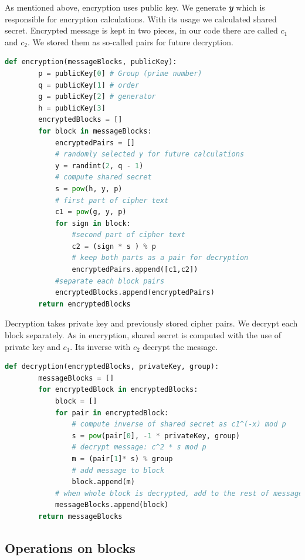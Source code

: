 \documentclass[a4paper,12pt]{article}
\begin{document}
As mentioned above, encryption uses public key. 
We generate \textbf{\textit{y}} which is responsible for encryption calculations. 
With its usage we calculated shared secret. 
Encrypted message is kept in two pieces, in our code there are called \textbf{\textit{$c_1$}} and \textbf{\textit{$c_2$}}.
We stored them as so-called pairs for future decryption.
\begin{lstlisting}[language=Python]
    def encryption(messageBlocks, publicKey):
        p = publicKey[0] # Group (prime number)
        q = publicKey[1] # order
        g = publicKey[2] # generator
        h = publicKey[3] 
        encryptedBlocks = []
        for block in messageBlocks:
            encryptedPairs = []
            # randomly selected y for future calculations
            y = randint(2, q - 1)
            # compute shared secret
            s = pow(h, y, p)
            # first part of cipher text
            c1 = pow(g, y, p)
            for sign in block:
                #second part of cipher text
                c2 = (sign * s ) % p
                # keep both parts as a pair for decryption 
                encryptedPairs.append([c1,c2])
            #separate each block pairs 
            encryptedBlocks.append(encryptedPairs)
        return encryptedBlocks
\end{lstlisting}
Decryption takes private key and previously stored cipher pairs. We decrypt each block separately.
As in encryption, shared secret is computed with the use of private key and $c_1$. Its inverse with $c_2$ decrypt the message.
\begin{lstlisting}[language=Python]
    def decryption(encryptedBlocks, privateKey, group):
        messageBlocks = []
        for encryptedBlock in encryptedBlocks:
            block = []
            for pair in encryptedBlock:
                # compute inverse of shared secret as c1^(-x) mod p 
                s = pow(pair[0], -1 * privateKey, group)
                # decrypt message: c^2 * s mod p 
                m = (pair[1]* s) % group
                # add message to block
                block.append(m)
            # when whole block is decrypted, add to the rest of message blocks    
            messageBlocks.append(block)
        return messageBlocks
\end{lstlisting}
\subsection{Operations on blocks}
\end{document}
